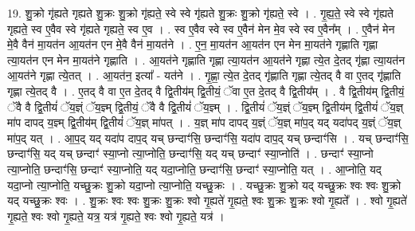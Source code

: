 \documentclass[17pt]{extarticle}
\begin{document}
19. शु॒क्रो गृ॑ह्यते गृह्यते शु॒क्रः शु॒क्रो गृ॑ह्यते॒ स्वे स्वे गृ॑ह्यते शु॒क्रः शु॒क्रो गृ॑ह्यते॒ स्वे । . गृ॒ह्य॒ते॒ स्वे स्वे गृ॑ह्यते गृह्यते॒ स्व ए॒वैव स्वे गृ॑ह्यते गृह्यते॒ स्व ए॒व । . स्व ए॒वैव स्वे स्व ए॒वैन॑ मेन मे॒व स्वे स्व ए॒वैन᳚म् । . ए॒वैन॑ मेन मे॒वै वैन॑ मा॒यत॑न आ॒यत॑न एन मे॒वै वैन॑ मा॒यत॑ने । . ए॒न॒ मा॒यत॑न आ॒यत॑न एन मेन मा॒यत॑ने गृह्णाति गृह्णा त्या॒यत॑न एन मेन मा॒यत॑ने गृह्णाति । . आ॒यत॑ने गृह्णाति गृह्णा त्या॒यत॑न आ॒यत॑ने गृह्णा त्ये॒त दे॒तद् गृ॑ह्णा त्या॒यत॑न आ॒यत॑ने गृह्णा त्ये॒तत् । . आ॒यत॑न॒ इत्या᳚ - यत॑ने । . गृ॒ह्णा॒ त्ये॒त दे॒तद् गृ॑ह्णाति गृह्णा त्ये॒तद् वै वा ए॒तद् गृ॑ह्णाति गृह्णा त्ये॒तद् वै । . ए॒तद् वै वा ए॒त दे॒तद् वै द्वि॒तीय॑म् द्वि॒तीयं॒ ॅवा ए॒त दे॒तद् वै द्वि॒तीय᳚म् । . वै द्वि॒तीय॑म् द्वि॒तीयं॒ ॅवै वै द्वि॒तीयं॑ ॅय॒ज्ञ्ं ॅय॒ज्ञ्म् द्वि॒तीयं॒ ॅवै वै द्वि॒तीयं॑ ॅय॒ज्ञ्म् । . द्वि॒तीयं॑ ॅय॒ज्ञ्ं ॅय॒ज्ञ्म् द्वि॒तीय॑म् द्वि॒तीयं॑ ॅय॒ज्ञ् मा॑प दापद् य॒ज्ञ्म् द्वि॒तीय॑म् द्वि॒तीयं॑ ॅय॒ज्ञ् मा॑पत् । . य॒ज्ञ् मा॑प दापद् य॒ज्ञ्ं ॅय॒ज्ञ् मा॑प॒द् यद् यदा॑पद् य॒ज्ञ्ं ॅय॒ज्ञ् मा॑प॒द् यत् । . आ॒प॒द् यद् यदा॑प दाप॒द् यच् छन्दाꣳ॑सि॒ छन्दाꣳ॑सि॒ यदा॑प दाप॒द् यच् छन्दाꣳ॑सि । . यच् छन्दाꣳ॑सि॒ छन्दाꣳ॑सि॒ यद् यच् छन्दाꣳ॑ स्या॒प्नो त्या॒प्नोति॒ छन्दाꣳ॑सि॒ यद् यच् छन्दाꣳ॑ स्या॒प्नोति॑ । . छन्दाꣳ॑ स्या॒प्नो त्या॒प्नोति॒ छन्दाꣳ॑सि॒ छन्दाꣳ॑ स्या॒प्नोति॒ यद् यदा॒प्नोति॒ छन्दाꣳ॑सि॒ छन्दाꣳ॑ स्या॒प्नोति॒ यत् । . आ॒प्नोति॒ यद् यदा॒प्नो त्या॒प्नोति॒ यच्छु॒क्रः शु॒क्रो यदा॒प्नो त्या॒प्नोति॒ यच्छु॒क्रः । . यच्छु॒क्रः शु॒क्रो यद् यच्छु॒क्रः श्वः श्वः शु॒क्रो यद् यच्छु॒क्रः श्वः । . शु॒क्रः श्वः श्वः शु॒क्रः शु॒क्रः श्वो गृ॒ह्यते॑ गृ॒ह्यते॒ श्वः शु॒क्रः शु॒क्रः श्वो गृ॒ह्यते᳚ । . श्वो गृ॒ह्यते॑ गृ॒ह्यते॒ श्वः श्वो गृ॒ह्यते॒ यत्र॒ यत्र॑ गृ॒ह्यते॒ श्वः श्वो गृ॒ह्यते॒ यत्र॑ । \newline
\end{document}
